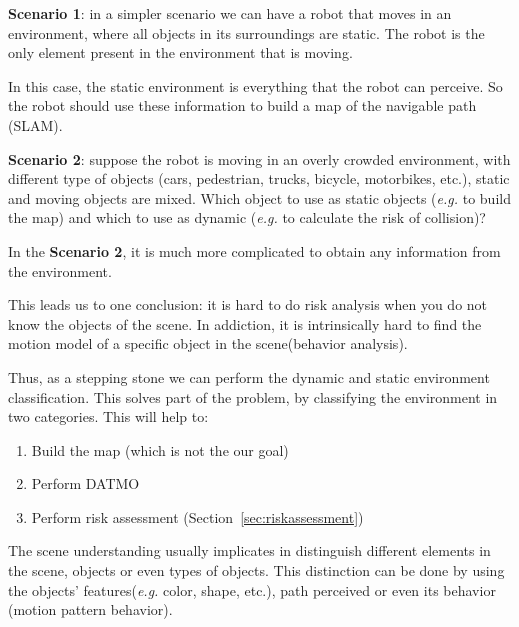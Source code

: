 \textbf{Scenario 1}: in a simpler scenario we can have a robot that moves in an environment, where all objects in its surroundings are static. The robot is the only element present in the environment that is moving.

In this case, the static environment is everything that the robot can perceive. So the robot should use these information to build a map of the navigable path (SLAM).

\textbf{Scenario 2}: suppose the robot is moving in an overly crowded environment, with different type of objects (cars, pedestrian, trucks, bicycle, motorbikes, etc.), static and moving objects are mixed. Which object to use as static objects (\textit{e.g.} to build the map) and which to use as dynamic (\textit{e.g.} to calculate the risk of collision)? 

In the \textbf{Scenario 2}, it is much more complicated to obtain any information from the environment.

This leads us to one conclusion: it is hard to do risk analysis when you do not know the objects of the scene. In addiction, it is intrinsically hard to find the motion model of a specific object in the scene(behavior analysis).

Thus, as a stepping stone we can perform the dynamic and static environment classification. This solves part of the problem, by classifying the environment in two categories. This will help to:

\begin{enumerate}
\item Build the map (which is not the our goal)
\item Perform DATMO
\item Perform risk assessment (Section~\ref{sec:riskassessment})
\end{enumerate}

The scene understanding usually implicates in distinguish different elements in the scene, objects or even types of objects. This distinction can be done by using the objects' features(\textit{e.g.} color, shape, etc.), path perceived or even its behavior (motion pattern behavior). 

